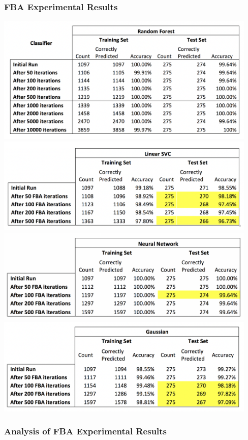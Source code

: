 \documentclass{article}
\begin{document}
\subsubsection{FBA Experimental Results}
\includegraphics[width=125mm]{rf_results.png}
\includegraphics[width=125mm]{linear_svc_results.png}
\includegraphics[width=125mm]{neural_network.png}
\includegraphics[width=125mm]{gaussian_results.png}

\subsubsection{Analysis of FBA Experimental Results}
\end{document}
